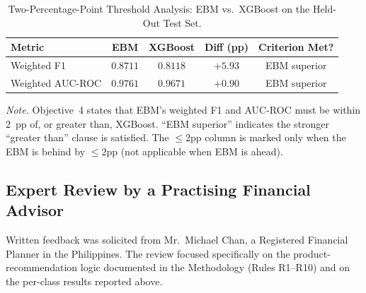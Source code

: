 \documentclass{icsthesis}
\begin{document}
\begin{mainmatter}
				\begin{table}[h]
				\vspace{4ex}
				\centering
				\caption{Two-Percentage-Point Threshold Analysis: EBM vs.\ XGBoost on the Held-Out Test Set.}
				\label{tab:threshold}
				\footnotesize
				\begin{tabular}{|p{1.7cm}|c|c|c|c|}
					\hline
					\textbf{Metric} & \textbf{EBM} & \textbf{XGBoost} & \textbf{Diff (pp)} & \textbf{Criterion Met?} \\
					\hline
					Weighted F1 & $0.8711$ & $0.8118$ & $+5.93$ & EBM superior \\
					Weighted AUC-ROC & $0.9761$ & $0.9671$ & $+0.90$ & EBM superior \\
					\hline
				\end{tabular}

				\vspace{0.5em}
				\raggedright\scriptsize \emph{Note.} Objective~4 states that EBM's weighted F1 and AUC-ROC must be within 2~pp of, or greater than, XGBoost. ``EBM superior'' indicates the stronger ``greater than'' clause is satisfied. The $\leq 2$pp column is marked only when the EBM is behind by $\leq 2$pp (not applicable when EBM is ahead).
				\vspace{4ex}
				\end{table}

			\subsection{Expert Review by a Practising Financial Advisor}
				Written feedback was solicited from Mr.\ Michael Chan, a Registered Financial Planner in the Philippines. The review focused specifically on the product-recommendation logic documented in the Methodology (Rules R1--R10) and on the per-class results reported above.


\end{mainmatter}
\end{document}
